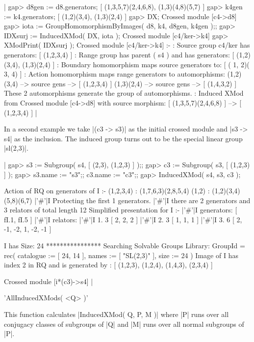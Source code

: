 |    gap> d8gen := d8.generators;
    [ (1,3,5,7)(2,4,6,8), (1,3)(4,8)(5,7) ]
    gap> k4gen := k4.generators;
    [ (1,2)(3,4), (1,3)(2,4) ]
    gap> DX;
    Crossed module [c4->d8]
    gap> iota := GroupHomomorphismByImages( d8, k4, d8gen, k4gen );;
    gap> IDXsurj := InducedXMod( DX, iota );
    Crossed module [c4/ker->k4]
    gap> XModPrint( IDXsurj );
    Crossed module [c4/ker->k4] :- 
    : Source group c4/ker has generators:
      [ (1,2,3,4) ]
    : Range group has parent ( s4 ) and has generators:
      [ (1,2)(3,4), (1,3)(2,4) ]
    : Boundary homomorphism maps source generators to:
      [ ( 1, 2)( 3, 4) ]
    : Action homomorphism maps range generators to automorphisms:
      (1,2)(3,4) --> { source gens --> [ (1,2,3,4) ] }
      (1,3)(2,4) --> { source gens --> [ (1,4,3,2) ] }
      These 2 automorphisms generate the group of automorphisms.
    : Induced XMod from Crossed module [c4->d8]  with source morphism:
      [ (1,3,5,7)(2,4,6,8) ]
       --> [ (1,2,3,4) ]    |

In a second example we take |(c3 -> s3)| as the initial crossed module
and |s3 -> s4|  as the inclusion.  The  induced group turns out  to be
the special linear group |sl(2,3)|.

|    gap> s3 := Subgroup( s4, [ (2,3), (1,2,3) ] );;
    gap> c3 := Subgroup( s3, [ (1,2,3) ] );
    gap> s3.name := "s3";;  c3.name := "c3";;
    gap> InducedXMod( s4, s3, c3 );

    Action of RQ on generators of I :- 
      (1,2,3,4) : (1,7,6,3)(2,8,5,4)
      (1,2) : (1,2)(3,4)(5,8)(6,7)
    |'\#'|I  Protecting the first 1 generators.
    |'\#'|I  there are 2 generators and 3 relators of total length 12
    Simplified presentation for I :- 
    |'\#'|I  generators: [ fI.1, fI.5 ]
    |'\#'|I  relators:
    |'\#'|I  1.  3  [ 2, 2, 2 ]
    |'\#'|I  2.  3  [ 1, 1, 1 ]
    |'\#'|I  3.  6  [ 2, -1, -2, 1, -2, -1 ]

     I has Size: 24
    **************** 
     Searching Solvable Groups Library:
     GroupId = 
    rec(
      catalogue := [ 24, 14 ],
      names := [ "SL(2,3)" ],
      size := 24 )
    Image of I has index 2 in RQ and is generated by : 
    [ (1,2,3), (1,2,4), (1,4,3), (2,3,4) ]

    Crossed module [i*(c3)->s4]            |

%

'AllInducedXMods( <Q> )'

This function calculates |InducedXMod( Q, P, M )|  where |P| runs over
all conjugacy classes of subgroups of |Q| and |M| runs over all normal
subgroups of |P|.

